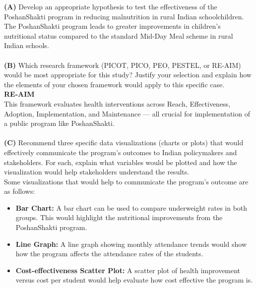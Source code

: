 \documentclass{article}
\begin{document}
\noindent \textbf{(A)} Develop an appropriate hypothesis to test the
effectiveness of the PoshanShakti program in reducing malnutrition in rural
Indian schoolchildren.
\\[0.2cm]
The PoshanShakti program leads to greater improvements in children's
nutritional status compared to the standard Mid-Day Meal scheme in rural Indian
schools.
\\\\
\noindent\textbf{(B)} Which research framework (PICOT, PICO, PEO, PESTEL, or
RE-AIM) would be
most appropriate for this study? Justify your selection and explain how the
elements of your chosen framework would apply to this specific case.
\\[0.2cm]
\textbf{RE-AIM}\\
This framework evaluates health interventions across Reach, Effectiveness,
Adoption,
Implementation, and Maintenance — all crucial for implementation of a public
program like
PoshanShakti.
\\\\
\noindent\textbf{(C)} Recommend three specific data visualizations (charts or
plots) that would
effectively communicate the program's outcomes to Indian policymakers and
stakeholders. For each, explain what variables would be plotted and how the
visualization would help stakeholders understand the results.
\\[0.2cm]
Some visualizations that would help to communicate the program's outcome are as
follows:
\begin{itemize}
    \item \textbf{Bar Chart:} A bar chart can be used to compare underweight
          rates in both groups. This would highlight the nutritional
          improvements from
          the PoshanShakti program.
    \item \textbf{Line Graph:} A line graph showing monthly attendance trends
          would show how the program affects the attendance rates of the
          students.
    \item \textbf{Cost-effectiveness Scatter Plot:} A scatter plot of health
          improvement versus cost per student would help evaluate how cost
          effective the
          program is.
\end{itemize}
\end{document}

